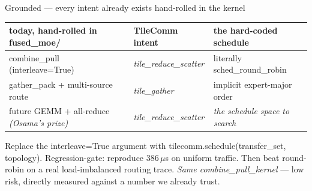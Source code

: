 \documentclass[pdf,aspectratio=169]{beamer}
\newcommand{\empy}[1]{{\color{darkorange}\emph{#1}}}
\newcommand{\empr}[1]{{\color{cardinalred}\emph{#1}}}
\newcommand{\examplebox}[2]{%
\begin{tcolorbox}[colframe=darkcardinal,colback=boxgray,title={#1}]
#2
\end{tcolorbox}}
\newcommand{\mc}[1]{{\ttfamily\small #1}}
\begin{document}
\begin{frame}{Grounded --- every intent already exists hand-rolled in the kernel}
\footnotesize
\begin{center}
\scriptsize
\begin{tabular}{p{} l p{}}
\toprule
today, hand-rolled in \mc{fused\_moe/} & TileComm intent & the hard-coded schedule \\
\midrule
\mc{combine\_pull} (\mc{interleave=True}) & \empy{tile\_reduce\_scatter} & literally \mc{sched\_round\_robin} \\
\mc{gather\_pack} + multi-source route & \empy{tile\_gather} & implicit expert-major order \\
future GEMM + all-reduce \emph{(Osama's prize)} & \empy{tile\_reduce\_scatter} & \empr{the schedule space to search} \\
\bottomrule
\end{tabular}
\end{center}
\examplebox{The concrete first step is a drop-in}{\footnotesize
Replace the \mc{interleave=True} argument with \mc{tilecomm.schedule(transfer\_set, topology)}. Regression-gate: reproduce 386\,$\mu$s on uniform traffic. Then beat round-robin on a real load-imbalanced routing trace. \empy{Same \mc{combine\_pull\_kernel}} --- low risk, directly measured against a number we already trust.}
\end{frame}
\end{document}
